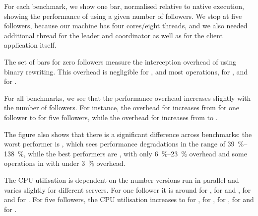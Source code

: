 For each benchmark, we show one bar, normalised relative to native execution,
showing the performance of \varan using a given number of followers.  We stop
at five followers, because our machine has four cores/eight threads, and we
also needed additional thread for the leader and coordinator as well as for the
client application itself.

The set of bars for zero followers measure the interception overhead
of \varan using binary rewriting.  This overhead is negligible for
\lighttpdtwo, \memcached and most \redis operations, \nginxIntercept for
\nginx, and \beanstalkdIntercept for \beanstalkd.

For all benchmarks, we see that the performance overhead increases slightly
with the number of followers. For instance, the overhead for \beanstalkd
increases from \beanstalkdOneFollower for one follower to
\beanstalkdFiveFollowers for five followers, while the overhead for \memcached
increases from \memcachedOneFollower to \memcachedFiveFollowers.

The figure also shows that there is a significant difference across benchmarks:
the worst performer is \redis, which sees performance degradations in the range
of \SIrange{39}{138}{\percent}, while the best performers are \lighttpdtwo,
with only \SIrange{6}{23}{\percent} overhead and some operations in \redis with
under \SI{3}{\percent} overhead.

The CPU utilisation is dependent on the number versions run in parallel and
varies slightly for different servers. For one follower it is around
\memcachedOneCpuFollower for \memcached, \lighttpdtwoCpuOneFollower for
\lighttpdtwo and \nginx, \redisCpuOneFollower for \redis and
\beanstalkdCpuOneFollower for \beanstalkd. For five followers, the CPU
utilisation increases to \memcachedCpuFiveFollowers for \memcached,
\beanstalkdCpuFiveFollowers for \beanstalkd, \redisCpuFiveFollowers for \redis,
\nginxCpuFiveFollowers for \nginx and \lighttpdtwoCpuFiveFollowers for
\lighttpdtwo.
